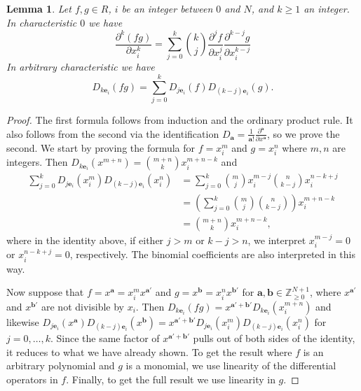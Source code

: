 \documentclass[12pt, reqno]{amsart}
\numberwithin{equation}{section}
\newcommand{\ba}{\mathbf{a}}
\newcommand{\bb}{\mathbf{b}}
\newcommand{\be}{\mathbf{e}}
\newcommand{\Z}{{\mathbb Z}}
\theoremstyle{plain} %
\newtheorem{lem}[thm]{Lemma}
\theoremstyle{definition}
\theoremstyle{remark}
\begin{document}
\begin{lem}\label{lem:HigherProductRule}
Let $f,g\in R$, $i$ be an integer between $0$ and $N$, and $k\ge 1$ an integer.  In characteristic $0$ we have
\[
\frac{\partial^k (fg)}{\partial x_i^k}=\sum_{j=0}^k \binom{k}{j} \frac{\partial^j f}{\partial x_i^j}\frac{\partial^{k-j} g}{\partial x_i^{k-j}}
\]
In arbitrary characteristic we have
\[
D_{k\be_i}(fg)=\sum_{j=0}^k D_{j\be_i}(f)D_{(k-j)\be_i}(g).
\]
\end{lem}
\begin{proof}
The first formula follows from induction and the ordinary product rule.  It also follows from the second via the identification $D_{\ba}=\frac{1}{\ba!}\frac{\partial^{\ba}}{\partial x^\ba}$, so we prove the second.  We start by proving the formula for $f=x_i^m$ and $g=x_i^n$ where $m,n$ are integers.  Then $D_{k\be_i}(x^{m+n})=\binom{m+n}{k}x_i^{m+n-k}$ and 
\begin{align*}
\sum_{j=0}^k D_{j\be_i}(x_i^m)D_{(k-j)\be_i}(x_i^n) & =\sum_{j=0}^k \binom{m}{j}x_i^{m-j}\binom{n}{k-j}x_i^{n-k+j}\\
&=\left(\sum_{j=0}^k \binom{m}{j}\binom{n}{k-j}\right)x_i^{m+n-k}\\
&=\binom{m+n}{k}x_i^{m+n-k},
\end{align*}
where in the identity above, if either $j>m$ or $k-j>n$, we interpret $x_i^{m-j}=0$ or $x_i^{n-k+j}=0$, respectively.  The binomial coefficients are also interpreted in this way.

Now suppose that $f=x^\ba=x_i^{m}x^{\ba'}$ and $g=x^\bb=x_i^nx^{\bb'}$ for $\ba,\bb\in\Z^{N+1}_{\ge 0}$, where $x^{\ba'}$ and $x^{\bb'}$ are not divisible by $x_i$.  Then $D_{k\be_i}(fg)=x^{\ba'+\bb'}D_{k\be_i}(x_i^{m+n})$ and likewise $D_{j\be_i}(x^\ba)D_{(k-j)\be_i}(x^\bb)=x^{\ba'+\bb'}D_{j\be_i}(x^m_i)D_{(k-j)\be_i}(x^n_i)$ for $j=0,\ldots,k$.  Since the same factor of $x^{\ba'+\bb'}$  pulls out of both sides of the identity, it reduces to what we have already shown.  To get the result where $f$ is an arbitrary polynomial and $g$ is a monomial, we use linearity of the differential operators in $f$.  Finally, to get the full result we use linearity in $g$.
\end{proof}
\end{document}
